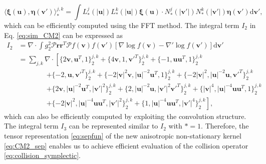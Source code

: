 \documentclass[preprint,1p,times]{elsarticle}
\theoremstyle{definition}
\theoremstyle{remark}
\begin{document}
\begin{equation*}
\langle \boldsymbol{\xi}(\boldsymbol{u}),\boldsymbol{\eta}(\boldsymbol{v}') \rangle_{\ast}^{j,k} = \int  L_{\ast}^{j}(|\boldsymbol{u}|) L_{\ast}^{k}(|\boldsymbol{u}|) \boldsymbol{\xi}(\boldsymbol{u}) \cdot N_{\ast}^{j}(|\boldsymbol{v}'|) N_{\ast}^{k}(|\boldsymbol{v}'|) \boldsymbol{\eta}(\boldsymbol{v}') \mathrm{d}\boldsymbol{v}',    
\end{equation*} 
which can be efficiently computed using the FFT method. The integral term $I_2$ in Eq. \eqref{eq:sim_CM2} can be expressed as
\begin{equation}\label{eq:I2}
    \begin{aligned}
        I_{2} &= \nabla \cdot \int g_{2}^{2} \boldsymbol{\mathcal{P}} \boldsymbol{r} \boldsymbol{r}^{T} \boldsymbol{\mathcal{P}} f(\boldsymbol{v}) f(\boldsymbol{v}') \left[ \nabla \log f(\boldsymbol{v}) - \nabla'\log f(\boldsymbol{v}') \right] \mathrm{d}\boldsymbol{v}' \\
        &= \sum_{j,k} \nabla \cdot 
        \left[ \{2\boldsymbol{v},\boldsymbol{u}^{T},1\}_{2}^{j,k} 
        + \{4\boldsymbol{v},1,\boldsymbol{v}'^{T}\}_{2}^{j,k} 
        + \{-1,\boldsymbol{u}\boldsymbol{u}^{T},1\}_{2}^{j,k} \right. \\
        &\qquad\qquad \left. + \{-2,\boldsymbol{u},\boldsymbol{v}'^{T}\}_{2}^{j,k} 
        + \{-2|\boldsymbol{v}|^{2}\boldsymbol{v},|\boldsymbol{u}|^{-2}\boldsymbol{u}^{T},1\}_{2}^{j,k} 
        + \{-2|\boldsymbol{v}|^{2},|\boldsymbol{u}|^{-2}\boldsymbol{u},\boldsymbol{v}'^{T}\}_{2}^{j,k} \right. \\
        &\qquad\qquad \left. 
        + \{2\boldsymbol{v},|\boldsymbol{u}|^{-2}\boldsymbol{u}^{T},|\boldsymbol{v}'|^{2}\}_{2}^{j,k} 
        + \{2,|\boldsymbol{u}|^{-2}\boldsymbol{u},|\boldsymbol{v}'|^{2}\boldsymbol{v}'^{T}\}_{2}^{j,k} 
        + \{|\boldsymbol{v}|^{4},|\boldsymbol{u}|^{-4}\boldsymbol{u}\boldsymbol{u}^{T},1\}_{2}^{j,k} \right. \\
        &\qquad\qquad \left. + \{-2|\boldsymbol{v}|^{2},|\boldsymbol{u}|^{-4}\boldsymbol{u}\boldsymbol{u}^{T},|\boldsymbol{v}'|^{2}\}_{2}^{j,k} 
        + \{1,|\boldsymbol{u}|^{-4}\boldsymbol{u}\boldsymbol{u}^{T},|\boldsymbol{v}'|^{4}\}_{2}^{j,k} \right] , 
    \end{aligned}
\end{equation}
which can also be efficiently computed by exploiting the convolution structure. The integral term $I_{3}$ can be represented similar to $I_{2}$ with $\ast=1$. Therefore, the tensor representation \eqref{eq:sepfun} of the new anisotropic non-stationary kernel \eqref{eq:CM2_sep} enables us to achieve efficient evaluation of the collision operator \eqref{eq:collision_symplectic}.  
\end{document}
